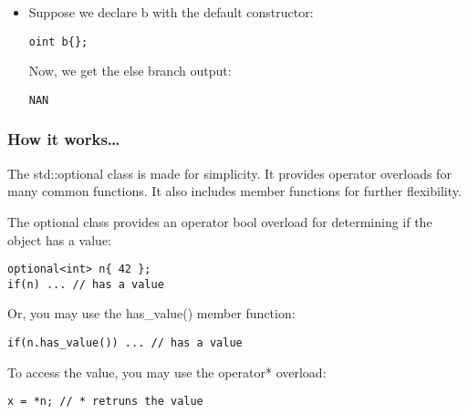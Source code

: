 \begin{itemize}
Now, we can operate on the oint objects directly:

\begin{lstlisting}[style=styleCXX]
auto sum{ a + b };
if(sum) {
	cout << format("{} + {} = {}\n", *a, *b, *sum);
} else {
	cout << "NAN\n";
}
\end{lstlisting}

Output:

\begin{lstlisting}[style=styleCXX]
42 + 73 = 115
\end{lstlisting}

\item 
Suppose we declare b with the default constructor:

\begin{lstlisting}[style=styleCXX]
oint b{};
\end{lstlisting}

Now, we get the else branch output:

\begin{lstlisting}[style=styleCXX]
NAN
\end{lstlisting}
\end{itemize}


\subsubsection{How it works…}

The std::optional class is made for simplicity. It provides operator overloads for many common functions. It also includes member functions for further flexibility.

The optional class provides an operator bool overload for determining if the object has a value:

\begin{lstlisting}[style=styleCXX]
optional<int> n{ 42 };
if(n) ... // has a value
\end{lstlisting}

Or, you may use the has\_value() member function:

\begin{lstlisting}[style=styleCXX]
if(n.has_value()) ... // has a value
\end{lstlisting}

To access the value, you may use the operator* overload:

\begin{lstlisting}[style=styleCXX]
x = *n; // * retruns the value
\end{lstlisting}

